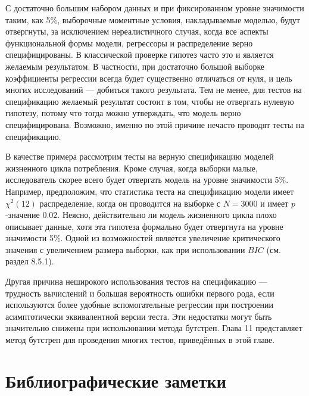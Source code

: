 С достаточно большим набором данных и при фиксированном уровне значимости таким, как 5\%, выборочные моментные условия, накладываемые моделью, будут отвергнуты, за исключением нереалистичного случая, когда все аспекты функциональной формы модели, регрессоры и распределение верно специфицированы. В классической проверке гипотез часто это и является желаемым результатом. В частности, при достаточно большой выборке коэффициенты регрессии всегда будет существенно отличаться от нуля, и цель многих исследований --- добиться такого результата. Тем не менее, для тестов на спецификацию желаемый результат состоит в том, чтобы не отвергать нулевую гипотезу, потому что тогда можно утверждать, что модель верно специфицирована. Возможно, именно по этой причине нечасто проводят тесты на спецификацию.

В качестве примера рассмотрим тесты на верную спецификацию моделей жизненного цикла потребления. Кроме случая, когда выборки малые, исследователь скорее всего будет отвергать модель на уровне значимости 5\%. Например, предположим, что статистика теста на спецификацию модели имеет $\chi^2(12)$ распределение, когда он проводится на выборке с $N = 3000$ и имеет $p$-значение 0.02. Неясно, действительно ли модель жизненного цикла  плохо описывает данные, хотя эта гипотеза формально будет отвергнута на уровне значимости 5\%. Одной из возможностей является увеличение критического значения с увеличением размера выборки, как при  использовании  $BIC$ (см. раздел 8.5.1).

Другая причина неширокого использования тестов на спецификацию --- трудность вычислений и большая вероятность ошибки первого рода, если используются более удобные вспомогательные регрессии при построении асимптотически эквивалентной версии теста. Эти недостатки могут быть значительно снижены при использовании метода бутстреп. Глава 11 представляет метод бутстреп для проведения многих тестов, приведённых в этой главе.

\section{Библиографические заметки}

